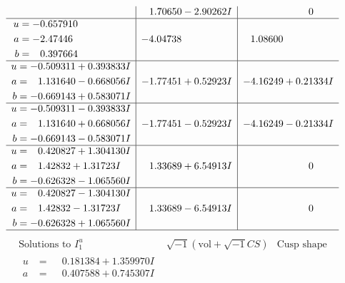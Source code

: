 \documentclass[1p]{elsarticle_modified}
\theoremstyle{definition}
\newcommand{\I}{\sqrt{-1}}
\begin{document}
$$\begin{array}{c|c|c}
 & \phantom{-}1.70650 - 2.90262 I & \phantom{-0.000000 } 0 \\ \hline\begin{aligned}
u &= -0.657910\phantom{ +0.000000I} \\
a &= -2.47446\phantom{ +0.000000I} \\
b &= \phantom{-}0.397664\phantom{ +0.000000I}\end{aligned}
 & -4.04738\phantom{ +0.000000I} & \phantom{-}1.08600\phantom{ +0.000000I} \\ \hline\begin{aligned}
u &= -0.509311 + 0.393833 I \\
a &= \phantom{-}1.131640 - 0.668056 I \\
b &= -0.669143 + 0.583071 I\end{aligned}
 & -1.77451 + 0.52923 I & -4.16249 + 0.21334 I \\ \hline\begin{aligned}
u &= -0.509311 - 0.393833 I \\
a &= \phantom{-}1.131640 + 0.668056 I \\
b &= -0.669143 - 0.583071 I\end{aligned}
 & -1.77451 - 0.52923 I & -4.16249 - 0.21334 I \\ \hline\begin{aligned}
u &= \phantom{-}0.420827 + 1.304130 I \\
a &= \phantom{-}1.42832 + 1.31723 I \\
b &= -0.626328 - 1.065560 I\end{aligned}
 & \phantom{-}1.33689 + 6.54913 I & \phantom{-0.000000 } 0 \\ \hline\begin{aligned}
u &= \phantom{-}0.420827 - 1.304130 I \\
a &= \phantom{-}1.42832 - 1.31723 I \\
b &= -0.626328 + 1.065560 I\end{aligned}
 & \phantom{-}1.33689 - 6.54913 I & \phantom{-0.000000 } 0\\
 \hline 
 \end{array}$$\newpage$$\begin{array}{c|c|c}  
\text{Solutions to }I^u_{1}& \I (\text{vol} + \sqrt{-1}CS) & \text{Cusp shape}\\
 \hline 
\begin{aligned}
u &= \phantom{-}0.181384 + 1.359970 I \\
a &= \phantom{-}0.407588 + 0.745307 I \\

\end{aligned}
\end{array}$$
\end{document}

